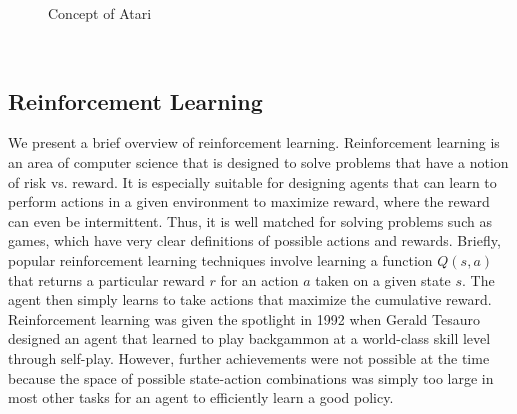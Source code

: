 \begin{figure}[h]
	\centering
	\hfill
	\caption{Concept of Atari}
\end{figure}
\\

\subsection{Reinforcement Learning}
We present a brief overview of reinforcement learning. Reinforcement learning is an area of computer science that is designed to solve problems that have a notion of risk vs. reward. It is especially suitable for designing agents that can learn to perform actions in a given environment to maximize reward, where the reward can even be intermittent. Thus, it is well matched for solving problems such as games, which have very clear definitions of possible actions and rewards. Briefly, popular reinforcement learning techniques involve learning a function $Q(s,a)$ that returns a particular reward $r$ for an action $a$ taken on a given state $s$. The agent then simply learns to take actions that maximize the cumulative reward. Reinforcement learning was given the spotlight in 1992 when Gerald Tesauro designed an agent that learned to play backgammon at a world-class skill level through self-play. However, further achievements were not possible at the time because the space of possible state-action combinations was simply too large in most other tasks for an agent to efficiently learn a good policy.

